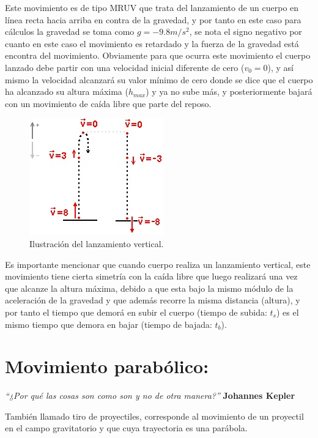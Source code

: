 \documentclass[a5paper,pagesize,10pt,bibtotoc,pointlessnumbers,
normalheadings,DIV=9,fleqn,x11names,table,twoside=false]{scrbook}
\begin{document}
Este movimiento es de tipo MRUV que trata del lanzamiento de un cuerpo en línea recta hacia arriba en contra de la gravedad, y 
por tanto en este caso para cálculos la gravedad se toma como $g = -9.8 m/s^2$, se nota el signo negativo por cuanto en este caso 
el movimiento es retardado y la fuerza de la gravedad está encontra del movimiento. Obviamente para que ocurra este movimiento el 
cuerpo lanzado debe partir con una velocidad inicial diferente de cero ($v_0 = 0$), y así mismo la velocidad alcanzará su valor 
mínimo de cero donde se dice que el cuerpo ha alcanzado su altura máxima ($h_{max}$) y ya no sube más, y posteriormente bajará con 
un movimiento de caída libre que parte del reposo.
 
\begin{figure}[ht]
 \centering
 \includegraphics[scale=0.7]{images/lanzamientovertical.jpg}
 \caption{Ilustración del lanzamiento vertical.}\label{lanzamientov}
\end{figure}   
 
Es importante mencionar que cuando cuerpo realiza un lanzamiento vertical, este movimiento tiene cierta simetría con la caída 
libre que luego realizará una vez que alcanze la altura máxima, debido a que esta bajo la mismo módulo de la aceleración de la 
gravedad y que además recorre la misma distancia (altura), y por tanto el tiempo que demorá en subir el cuerpo (tiempo de subida: 
$t_s$) es el mismo tiempo que demora en bajar (tiempo de bajada: $t_b$).

\chapter{Movimiento parabólico:} 
 
\textit{``¿Por qué las cosas son como son y no de otra manera?''} \textbf{Johannes Kepler}
\vspace{1.0cm}  
 
También llamado tiro de proyectiles, corresponde al movimiento de un proyectil en el campo gravitatorio y que cuya  trayectoria es 
una parábola.
 
\end{document}
